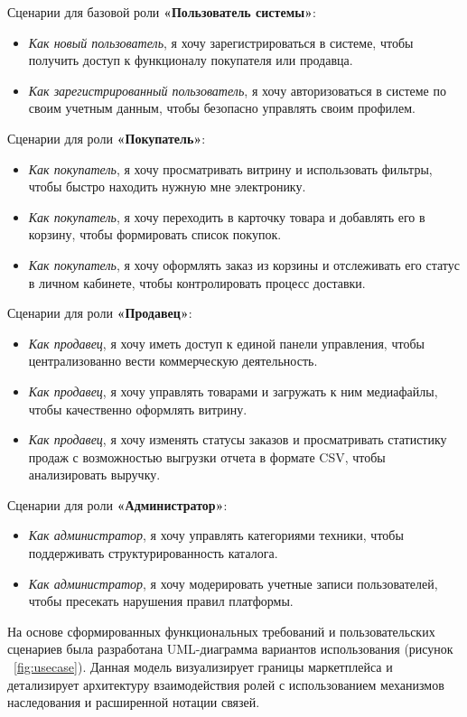 Сценарии для базовой роли \textbf{«Пользователь системы»}:
\begin{itemize}
    \item \textit{Как новый пользователь}, я хочу зарегистрироваться в системе, чтобы получить доступ к функционалу покупателя или продавца.
    \item \textit{Как зарегистрированный пользователь}, я хочу авторизоваться в системе по своим учетным данным, чтобы безопасно управлять своим профилем.
\end{itemize}

Сценарии для роли \textbf{«Покупатель»}:
\begin{itemize}
    \item \textit{Как покупатель}, я хочу просматривать витрину и использовать фильтры, чтобы быстро находить нужную мне электронику.
    \item \textit{Как покупатель}, я хочу переходить в карточку товара и добавлять его в корзину, чтобы формировать список покупок.
    \item \textit{Как покупатель}, я хочу оформлять заказ из корзины и отслеживать его статус в личном кабинете, чтобы контролировать процесс доставки.
\end{itemize}

Сценарии для роли \textbf{«Продавец»}:
\begin{itemize}
    \item \textit{Как продавец}, я хочу иметь доступ к единой панели управления, чтобы централизованно вести коммерческую деятельность.
    \item \textit{Как продавец}, я хочу управлять товарами и загружать к ним медиафайлы, чтобы качественно оформлять витрину.
    \item \textit{Как продавец}, я хочу изменять статусы заказов и просматривать статистику продаж с возможностью выгрузки отчета в формате CSV, чтобы анализировать выручку.
\end{itemize}

Сценарии для роли \textbf{«Администратор»}:
\begin{itemize}
    \item \textit{Как администратор}, я хочу управлять категориями техники, чтобы поддерживать структурированность каталога.
    \item \textit{Как администратор}, я хочу модерировать учетные записи пользователей, чтобы пресекать нарушения правил платформы.
\end{itemize}

На основе сформированных функциональных требований и пользовательских сценариев была разработана UML-диаграмма вариантов использования (рисунок ~\ref{fig:usecase}). Данная модель 
визуализирует границы маркетплейса и детализирует архитектуру взаимодействия ролей с использованием механизмов наследования и расширенной нотации связей.

